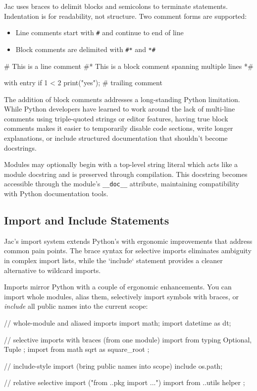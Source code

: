Jac uses braces to delimit blocks and semicolons to terminate statements. Indentation is for readability, not structure. Two comment forms are supported:

\begin{itemize}
    \item Line comments start with \texttt{\#} and continue to end of line
    \item Block comments are delimited with \texttt{\#*} and \texttt{*\#}
\end{itemize}

\begin{jacblock}
# This is a line comment
#*
This is a block comment
spanning multiple lines
*#

with entry {
    if 1 < 2 {
        print("yes");  # trailing comment
    }
}
\end{jacblock}

The addition of block comments addresses a long-standing Python limitation. While Python developers have learned to work around the lack of multi-line comments using triple-quoted strings or editor features, having true block comments makes it easier to temporarily disable code sections, write longer explanations, or include structured documentation that shouldn't become docstrings.

Modules may optionally begin with a top-level string literal which acts like a module docstring and is preserved through compilation. This docstring becomes accessible through the module's \texttt{\_\_doc\_\_} attribute, maintaining compatibility with Python documentation tools.

\subsection{Import and Include Statements}

Jac's import system extends Python's with ergonomic improvements that address common pain points. The brace syntax for selective imports eliminates ambiguity in complex import lists, while the `include` statement provides a cleaner alternative to wildcard imports.

Imports mirror Python with a couple of ergonomic enhancements. You can import whole modules, alias them, selectively import symbols with braces, or \emph{include} all public names into the current scope:

\begin{jacblock}
// whole-module and aliased imports
import math;
import datetime as dt;

// selective imports with braces (from one module)
import from typing { Optional, Tuple };
import from math { sqrt as square_root };

// include-style import (bring public names into scope)
include os.path;

// relative selective import ("from ..pkg import {...}")
import from ..utils { helper };
\end{jacblock}

